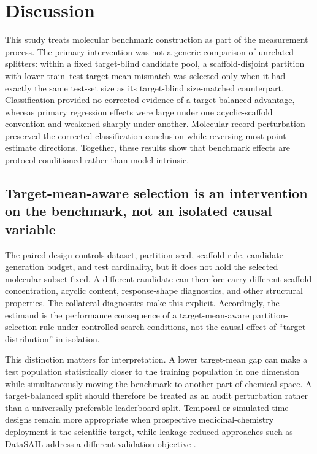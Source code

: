 \section{Discussion}

This study treats molecular benchmark construction as part of the measurement process. The primary intervention was not a generic comparison of unrelated splitters: within a fixed target-blind candidate pool, a scaffold-disjoint partition with lower train--test target-mean mismatch was selected only when it had exactly the same test-set size as its target-blind size-matched counterpart. Classification provided no corrected evidence of a target-balanced advantage, whereas primary regression effects were large under one acyclic-scaffold convention and weakened sharply under another. Molecular-record perturbation preserved the corrected classification conclusion while reversing most point-estimate directions. Together, these results show that benchmark effects are protocol-conditioned rather than model-intrinsic.

\subsection{Target-mean-aware selection is an intervention on the benchmark, not an isolated causal variable}

The paired design controls dataset, partition seed, scaffold rule, candidate-generation budget, and test cardinality, but it does not hold the selected molecular subset fixed. A different candidate can therefore carry different scaffold concentration, acyclic content, response-shape diagnostics, and other structural properties. The collateral diagnostics make this explicit. Accordingly, the estimand is the performance consequence of a target-mean-aware partition-selection rule under controlled search conditions, not the causal effect of ``target distribution'' in isolation.

This distinction matters for interpretation. A lower target-mean gap can make a test population statistically closer to the training population in one dimension while simultaneously moving the benchmark to another part of chemical space. A target-balanced split should therefore be treated as an audit perturbation rather than a universally preferable leaderboard split. Temporal or simulated-time designs remain more appropriate when prospective medicinal-chemistry deployment is the scientific target, while leakage-reduced approaches such as DataSAIL address a different validation objective \citep{landrum2023simpd,joeres2025datasail}.


